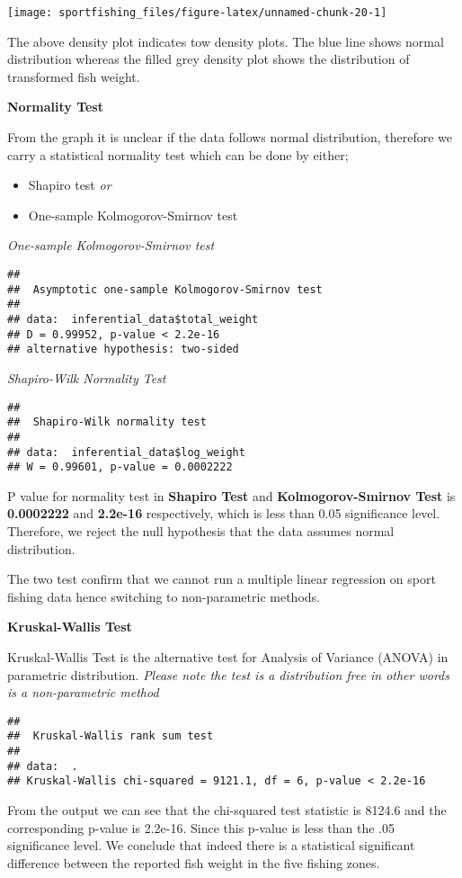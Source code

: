 \documentclass[
]{article}
\providecommand{\tightlist}{%
  \setlength{\itemsep}{0pt}\setlength{\parskip}{0pt}}
\begin{document}
\begin{center}\texttt{[image: sportfishing\_files/figure-latex/unnamed-chunk-20-1]} \end{center}

The above density plot indicates tow density plots. The blue line shows
normal distribution whereas the filled grey density plot shows the
distribution of transformed fish weight.

\newpage

\textbf{Normality Test}

From the graph it is unclear if the data follows normal distribution,
therefore we carry a statistical normality test which can be done by
either;

\begin{itemize}
\tightlist
\item
  Shapiro test \emph{or}
\item
  One-sample Kolmogorov-Smirnov test
\end{itemize}

\emph{One-sample Kolmogorov-Smirnov test}

\begin{verbatim}
## 
##  Asymptotic one-sample Kolmogorov-Smirnov test
## 
## data:  inferential_data$total_weight
## D = 0.99952, p-value < 2.2e-16
## alternative hypothesis: two-sided
\end{verbatim}

\emph{Shapiro-Wilk Normality Test}

\begin{verbatim}
## 
##  Shapiro-Wilk normality test
## 
## data:  inferential_data$log_weight
## W = 0.99601, p-value = 0.0002222
\end{verbatim}

P value for normality test in \textbf{Shapiro Test} and
\textbf{Kolmogorov-Smirnov Test} is \textbf{0.0002222} and
\textbf{2.2e-16} respectively, which is less than 0.05 significance
level. Therefore, we reject the null hypothesis that the data assumes
normal distribution.

The two test confirm that we cannot run a multiple linear regression on
sport fishing data hence switching to non-parametric methods.

\textbf{Kruskal-Wallis Test}

Kruskal-Wallis Test is the alternative test for Analysis of Variance
(ANOVA) in parametric distribution. \emph{Please note the test is a
distribution free in other words is a non-parametric method}

\begin{verbatim}
## 
##  Kruskal-Wallis rank sum test
## 
## data:  .
## Kruskal-Wallis chi-squared = 9121.1, df = 6, p-value < 2.2e-16
\end{verbatim}

From the output we can see that the chi-squared test statistic is 8124.6
and the corresponding p-value is 2.2e-16. Since this p-value is less
than the .05 significance level. We conclude that indeed there is a
statistical significant difference between the reported fish weight in
the five fishing zones.
\end{document}
